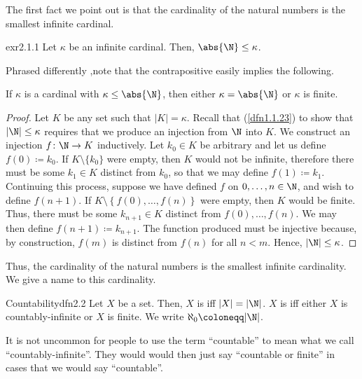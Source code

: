 The first fact we point out is that the cardinality of the natural numbers is the smallest infinite cardinal.
\begin{prp}{}{exr2.1.1}
Let $\kappa$ be an infinite cardinal.  Then, $\abs{\N}\leq \kappa$.
\begin{rmk}
Phrased differently ,note that the contrapositive easily implies the following.
\begin{displayquote}
If $\kappa$ is a cardinal with $\kappa \leq \abs{\N}$, then either $\kappa =\abs{\N}$ or $\kappa$ is finite.
\end{displayquote}
\end{rmk}
\begin{proof}
Let $K$ be any set such that $|K|=\kappa$.  Recall that (\cref{dfn1.1.23}) to show that $|\N |\leq \kappa$ requires that we produce an injection from $\N$ into $K$.  We construct an injection $f\colon \N \rightarrow K$ inductively.  Let $k_0\in K$ be arbitrary and let us define $f(0)\coloneqq k_0$.  If $K\setminus \{ k_0\}$ were empty, then $K$ would not be infinite, therefore there must be some $k_1\in K$ distinct from $k_0$, so that we may define $f(1)\coloneqq k_1$.  Continuing this process, suppose we have defined $f$ on $0,\ldots ,n\in \N$, and wish to define $f(n+1)$.  If $K\setminus \left\{ f(0),\ldots ,f(n)\right\}$ were empty, then $K$ would be finite.  Thus, there must be some $k_{n+1}\in K$ distinct from $f(0),\ldots ,f(n)$.  We may then define $f(n+1)\coloneqq k_{n+1}$.  The function produced must be injective because, by construction, $f(m)$ is distinct from $f(n)$ for all $n<m$.  Hence, $|\N |\leq \kappa$.
\end{proof}
\end{prp}
Thus, the cardinality of the natural numbers is the smallest infinite cardinality.  We give a name to this cardinality.
\begin{dfn}{Countability}{dfn2.2}
Let $X$ be a set.  Then, $X$ is  iff $|X|=|\N |$.  $X$ is  iff either $X$ is countably-infinite or $X$ is finite.  We write $\aleph _0\coloneqq |\N |$.
\begin{rmk}
It is not uncommon for people to use the term ``countable'' to mean what we call ``countably-infinite''.  They would would then just say ``countable or finite'' in cases that we would say ``countable''.
\end{rmk}
\end{dfn}

